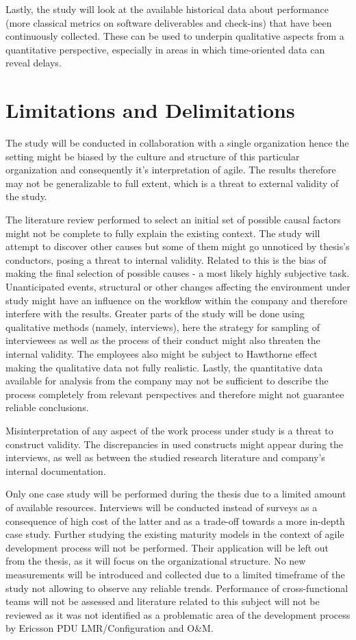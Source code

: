 \documentclass[paper=a4, fontsize=11pt]{scrartcl}
\numberwithin{equation}{section}		%
\numberwithin{figure}{section}			%
\numberwithin{table}{section}			%
\begin{document}
Lastly, the study will look at the available historical data about performance (more classical metrics on software deliverables and check-ins) that have been continuously collected. These can be used to underpin qualitative aspects from a quantitative perspective, especially in areas in which time-oriented data can reveal delays.

\section{Limitations and Delimitations}

The study will be conducted in collaboration with a single organization hence the setting might be biased by the culture and structure of this particular organization and consequently it's interpretation of agile. The results therefore may not be generalizable to full extent, which is a threat to external validity of the study.

The literature review performed to select an initial set of possible causal factors might not be complete to fully explain the existing context. The study will attempt to discover other causes but some of them might go unnoticed by thesis's conductors, posing a threat to internal validity. Related to this is the bias of making the final selection of possible causes - a most likely highly subjective task. Unanticipated events, structural or other changes affecting the environment under study might have an influence on the workflow within the company and therefore interfere with the results. Greater parts of the study will be done using qualitative methods (namely, interviews), here the strategy for sampling of interviewees as well as the process of their conduct might also threaten the internal validity. The employees also might be subject to Hawthorne effect making the qualitative data not fully realistic. Lastly, the quantitative data available for analysis from the company may not be sufficient to describe the process completely from relevant perspectives and therefore might not guarantee reliable conclusions.

Misinterpretation of any aspect of the work process under study is a threat to construct validity. The discrepancies in used constructs might appear during the interviews, as well as between the studied research literature and company's internal documentation.

Only one case study will be performed during the thesis due to a limited amount of available resources. Interviews will be conducted instead of surveys as a consequence of high cost of the latter and as a trade-off towards a more in-depth case study.
Further studying the existing maturity models in the context of agile development process will not be performed. Their application will be left out from the thesis, as it will focus on the organizational structure. No new measurements will be introduced and collected due to a limited timeframe of the study not allowing to observe any reliable trends. Performance of cross-functional teams will not be assessed and literature related to this subject will not be reviewed as it was not identified as a problematic area of the development process by Ericsson PDU LMR/Configuration and O\&M.
\end{document}
